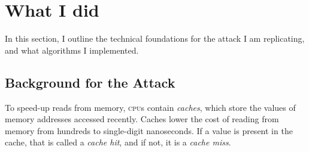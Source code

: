 \documentclass[a4paper,10pt,twocolumn]{article}
\theoremstyle{definition}
\newcommand*{\acronym}{\textsc}
\begin{document}


\section{What I did}

In this section, I outline the technical foundations for the attack I am
replicating, and what algorithms I implemented.

\subsection{Background for the Attack}

To speed-up reads from memory, \acronym{cpu}s contain \emph{caches}, which store
the values of memory addresses accessed recently.
Caches lower the cost of reading from memory from hundreds to single-digit
nanoseconds.
If a value is present in the cache, that is called a \emph{cache hit}, and if
not, it is a \emph{cache miss}.
\end{document}
